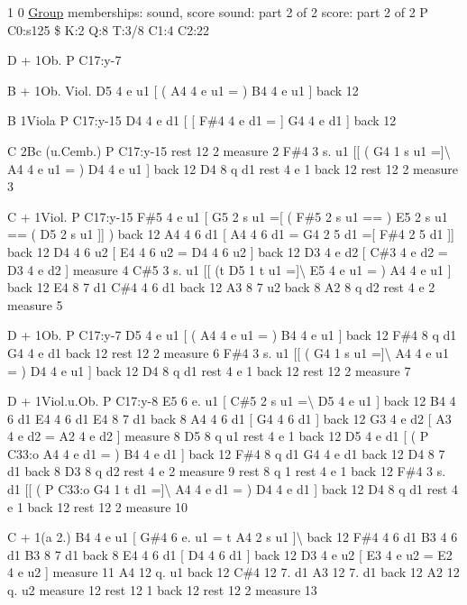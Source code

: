1 0 \hyperlink{class_group}{Group} memberships\+: sound, score sound\+: part 2 of 2 score\+: part 2 of 2 P C0\+:s125 \$ K\+:2 Q\+:8 T\+:3/8 C1\+:4 C2\+:22
\begin{DoxyItemize}
\item D + 1\+Ob. P C17\+:y-\/7
\item B + 1\+Ob. Viol. D5 4 e u1 \mbox{[} ( A4 4 e u1 = ) B4 4 e u1 \mbox{]} back 12
\item B 1\+Viola P C17\+:y-\/15 D4 4 e d1 \mbox{[} \mbox{[} F\#4 4 e d1 = \mbox{]} G4 4 e d1 \mbox{]} back 12
\item C 2\+Bc (u.\+Cemb.) P C17\+:y-\/15 rest 12 2 measure 2 F\#4 3 s. u1 \mbox{[}\mbox{[} ( G4 1 s u1 =\mbox{]}\textbackslash{} A4 4 e u1 = ) D4 4 e u1 \mbox{]} back 12 D4 8 q d1 rest 4 e 1 back 12 rest 12 2 measure 3
\item C + 1\+Viol. P C17\+:y-\/15 F\#5 4 e u1 \mbox{[} G5 2 s u1 =\mbox{[} ( F\#5 2 s u1 == ) E5 2 s u1 == ( D5 2 s u1 \mbox{]}\mbox{]} ) back 12 A4 4 6 d1 \mbox{[} A4 4 6 d1 = G4 2 5 d1 =\mbox{[} F\#4 2 5 d1 \mbox{]}\mbox{]} back 12 D4 4 6 u2 \mbox{[} E4 4 6 u2 = D4 4 6 u2 \mbox{]} back 12 D3 4 e d2 \mbox{[} C\#3 4 e d2 = D3 4 e d2 \mbox{]} measure 4 C\#5 3 s. u1 \mbox{[}\mbox{[} (t D5 1 t u1 =\mbox{]}\textbackslash{} E5 4 e u1 = ) A4 4 e u1 \mbox{]} back 12 E4 8 7 d1 C\#4 4 6 d1 back 12 A3 8 7 u2 back 8 A2 8 q d2 rest 4 e 2 measure 5
\item D + 1\+Ob. P C17\+:y-\/7 D5 4 e u1 \mbox{[} ( A4 4 e u1 = ) B4 4 e u1 \mbox{]} back 12 F\#4 8 q d1 G4 4 e d1 back 12 rest 12 2 measure 6 F\#4 3 s. u1 \mbox{[}\mbox{[} ( G4 1 s u1 =\mbox{]}\textbackslash{} A4 4 e u1 = ) D4 4 e u1 \mbox{]} back 12 D4 8 q d1 rest 4 e 1 back 12 rest 12 2 measure 7
\item D + 1\+Viol.\+u.\+Ob. P C17\+:y-\/8 E5 6 e. u1 \mbox{[} C\#5 2 s u1 =\textbackslash{} D5 4 e u1 \mbox{]} back 12 B4 4 6 d1 E4 4 6 d1 E4 8 7 d1 back 8 A4 4 6 d1 \mbox{[} G4 4 6 d1 \mbox{]} back 12 G3 4 e d2 \mbox{[} A3 4 e d2 = A2 4 e d2 \mbox{]} measure 8 D5 8 q u1 rest 4 e 1 back 12 D5 4 e d1 \mbox{[} ( P C33\+:o A4 4 e d1 = ) B4 4 e d1 \mbox{]} back 12 F\#4 8 q d1 G4 4 e d1 back 12 D4 8 7 d1 back 8 D3 8 q d2 rest 4 e 2 measure 9 rest 8 q 1 rest 4 e 1 back 12 F\#4 3 s. d1 \mbox{[}\mbox{[} ( P C33\+:o G4 1 t d1 =\mbox{]}\textbackslash{} A4 4 e d1 = ) D4 4 e d1 \mbox{]} back 12 D4 8 q d1 rest 4 e 1 back 12 rest 12 2 measure 10
\item C + 1(a 2.) B4 4 e u1 \mbox{[} G\#4 6 e. u1 = t A4 2 s u1 \mbox{]}\textbackslash{} back 12 F\#4 4 6 d1 B3 4 6 d1 B3 8 7 d1 back 8 E4 4 6 d1 \mbox{[} D4 4 6 d1 \mbox{]} back 12 D3 4 e u2 \mbox{[} E3 4 e u2 = E2 4 e u2 \mbox{]} measure 11 A4 12 q. u1 back 12 C\#4 12 7. d1 A3 12 7. d1 back 12 A2 12 q. u2 measure 12 rest 12 1 back 12 rest 12 2 measure 13

\end{DoxyItemize}
